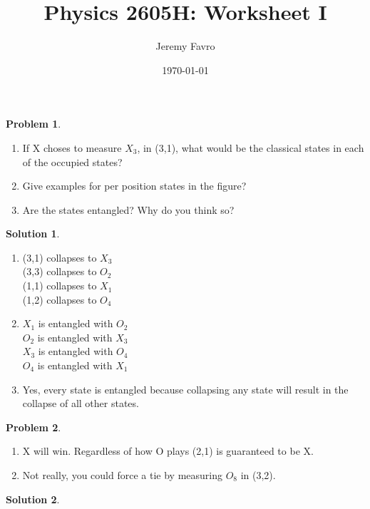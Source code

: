 \documentclass[10pt]{article}
\title{Physics 2605H: Worksheet I}
\author{Jeremy Favro}
\date{\today}
\theoremstyle{definition}
\newtheorem{problem}{Problem}
\newtheorem{soln}{Solution}
\begin{document}
\maketitle

\begin{problem}~
  \begin{enumerate}[label=(\alph*)]
    \item If X choses to measure $X_3$, in (3,1), what would be the classical states in each of the occupied states?
    \item Give examples for per position states in the figure?
    \item Are the states entangled? Why do you think so?
  \end{enumerate}
\end{problem}
\begin{soln}~
  \begin{enumerate}[label=(\alph*)]
    \item (3,1) collapses to $X_3$\\
    (3,3) collapses to $O_2$\\
    (1,1) collapses to $X_1$\\
    (1,2) collapses to $O_4$
    \item $X_1$ is entangled with $O_2$\\
    $O_2$ is entangled with $X_3$\\
    $X_3$ is entangled with $O_4$\\
    $O_4$ is entangled with $X_1$
    \item Yes, every state is entangled because collapsing any state will result in the collapse of all other states.
  \end{enumerate}
\end{soln}

\begin{problem}~
  \begin{enumerate}[label=(\alph*)]
    \item X will win. Regardless of how O plays (2,1) is guaranteed to be X.
    \item Not really, you could force a tie by measuring $O_8$ in (3,2).
  \end{enumerate}
\end{problem}
\begin{soln}~
\end{soln}
\end{document}
